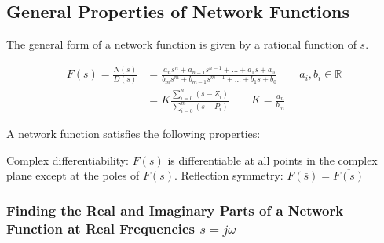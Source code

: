 \documentclass{report}
\begin{document}
\subsection{General Properties of Network Functions}

The general form of a network function is given by a rational function of $s$.

\begin{align*}
	F(s) = \frac{N(s)}{D(s)} & = \frac{a_ns^n + a_{n-1}s^{n-1} + \ldots + a_1s + a_0}{b_ms^m + b_{m-1}s^{m-1} + \ldots + b_1s + b_0} \qquad a_i, b_i \in \mathbb{R} \\
	                         & = K\frac{\sum_{i=0}^{n} (s-Z_i)}{\sum_{i=0}^{m} (s-P_i)} \qquad K = \frac{a_n}{b_m}
\end{align*}

A network function satisfies the following properties:


\begin{itemize}
	\ii Complex differentiability: $F(s)$ is differentiable at all points in the complex plane except at the poles of $F(s)$.
	\ii Reflection symmetry: $F(\bar{s}) = \overline{F(s)}$
\end{itemize}

\subsubsection{Finding the Real and Imaginary Parts of a Network Function at Real Frequencies $s=j\omega$}
\end{document}

